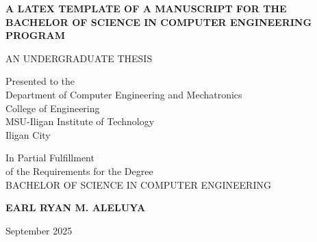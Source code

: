 

       \begin{center}
       \textbf{A LATEX TEMPLATE OF A MANUSCRIPT FOR THE BACHELOR OF SCIENCE IN COMPUTER ENGINEERING PROGRAM}

       \vspace{2cm}
            AN UNDERGRADUATE THESIS
       
       \vspace{2cm}  
            Presented to the\\  
            Department of Computer Engineering and Mechatronics\\ 
            College of Engineering\\
            MSU-Iligan Institute of Technology\\ 
            Iligan City

      \vspace{2cm}      
          In Partial Fulfillment\\ 
          of the Requirements for the Degree\\ 
          BACHELOR OF SCIENCE IN COMPUTER ENGINEERING

     \vspace{2cm}

        \textbf{EARL RYAN M. ALELUYA}\\
        \vspace{2cm}

        September 2025
            
   \end{center}